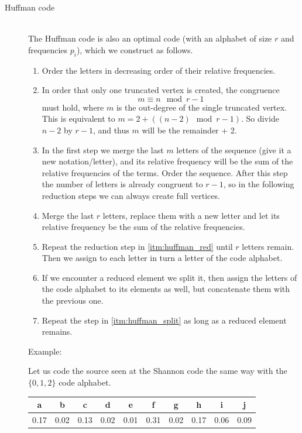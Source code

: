 \documentclass[margin=0px]{article}
\begin{document}
\begin{description}
    \item[Huffman code] \hfill \\
        The Huffman code is also an optimal code (with an alphabet of size $r$ and frequencies $p_i$), which we construct as follows.
        \begin{enumerate}
            \item Order the letters in decreasing order of their relative frequencies.
            \item In order that only one truncated vertex is created, the congruence
                  \[m \equiv n \mod{r-1}\]
                  must hold, where $m$ is the out-degree of the single truncated vertex. This is equivalent to $m = 2 + ((n-2) \mod{r-1})$. So divide $n-2$ by $r-1$, and thus $m$ will be the remainder + 2.
            \item In the first step we merge the last $m$ letters of the sequence (give it a new notation/letter), and its relative frequency will be the sum of the relative frequencies of the terms. Order the sequence. After this step the number of letters is already congruent to $r-1$, so in the following reduction steps we can always create full vertices.
            \item \label{itm:huffman_red} Merge the last $r$ letters, replace them with a new letter and let its relative frequency be the sum of the relative frequencies.
            \item Repeat the reduction step in \ref{itm:huffman_red} until $r$ letters remain. Then we assign to each letter in turn a letter of the code alphabet.
            \item \label{itm:huffman_split} If we encounter a reduced element we split it, then assign the letters of the code alphabet to its elements as well, but concatenate them with the previous one.
            \item Repeat the step in \ref{itm:huffman_split} as long as a reduced element remains.
        \end{enumerate}

        Example:

        Let us code the source seen at the Shannon code the same way with the $\{0,1,2\}$ code alphabet.

        \begin{tabular}{|c|c|c|c|c|c|c|c|c|c|}
            \hline a    & b    & c    & d    & e    & f    & g    & h    & i    & j    \\
            \hline 0.17 & 0.02 & 0.13 & 0.02 & 0.01 & 0.31 & 0.02 & 0.17 & 0.06 & 0.09 \\
            \hline
        \end{tabular}


\end{description}
\end{document}
